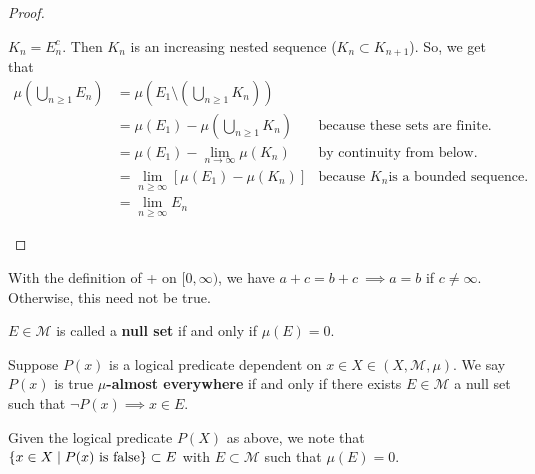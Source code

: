 \documentclass[11pt,leqno,oneside]{amsbook}
\numberwithin{thm}{section}
\newcommand{\M}{\mathcal{M}} %
\renewcommand{\de}{\textbf} %
\begin{document}
\begin{proof}
\begin{enumerate}
    $K_n = E_n^c$. Then $K_n$ is an increasing nested sequence ($K_n
    \subset K_{n+1}$). So, we get that
    \begin{align*}
      \mu\left( \bigcup_{n \geq 1} E_n \right) & = \mu\left( E_1
                                                 \setminus \left(
                                                 \bigcup_{n \geq 1}
                                                 K_n \right) \right)\\
& = \mu(E_1) - \mu\left( \bigcup_{n \geq 1} K_n \right) & \text{
                                                          because
                                                          these sets
                                                          are
                                                          finite.}\\
& = \mu(E_1) - \lim_{n \to \infty} \mu(K_n) & \text{by continuity from
                                              below.} \\
& = \lim_{n \geq \infty} \left[ \mu(E_1) - \mu(K_n) \right] & \text{
                                                              because
                                                              }K_n\text{
                                                              is a
                                                              bounded
                                                              sequence.}\\
      & = \lim_{n \geq \infty} E_n&
    \end{align*}

  \end{enumerate}
\end{proof}
\begin{rmk}
  With the definition of + on $[0,\infty)$, we have $a+c = b+c \
  \implies a=b$ if $c \neq \infty$. Otherwise, this need not be true.
\end{rmk}
\begin{defn}
  $E \in \M$ is called a \de{null set} if and only if $\mu(E) = 0$.
\end{defn}
\begin{defn}
  Suppose $P(x)$ is a logical predicate dependent on $x \in X \in (X,
  \M, \mu)$. We say $P(x)$ is true \de{$\mu$-almost everywhere} if and
  only if there exists $E \in \M$ a null set such that $\neg P(x)
  \implies  x \in E$.
\end{defn}
\begin{rmk}
  Given the logical predicate \(P(X)\) as above, we note that $\{x \in
  X \mid P(x) \text{ is false}\} \subset E$ with
  $E \subset \M$ such that $\mu(E) = 0$.
\end{rmk}
\end{document}
